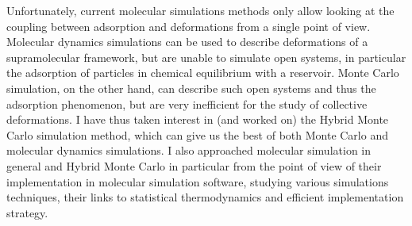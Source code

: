 Unfortunately, current molecular simulations methods only allow looking at the
coupling between adsorption and deformations from a single point of view.
Molecular dynamics simulations can be used to describe deformations of a
supramolecular framework, but are unable to simulate open systems, in particular
the adsorption of particles in chemical equilibrium with a reservoir. Monte
Carlo simulation, on the other hand, can describe such open systems and thus the
adsorption phenomenon, but are very inefficient for the study of collective
deformations. I have thus taken interest in (and worked on) the Hybrid Monte
Carlo simulation method, which can give us the best of both Monte Carlo and
molecular dynamics simulations. I also approached molecular simulation in
general and Hybrid Monte Carlo in particular from the point of view of their
implementation in molecular simulation software, studying various simulations
techniques, their links to statistical thermodynamics and efficient
implementation strategy.

\begin{center}
\end{center}

